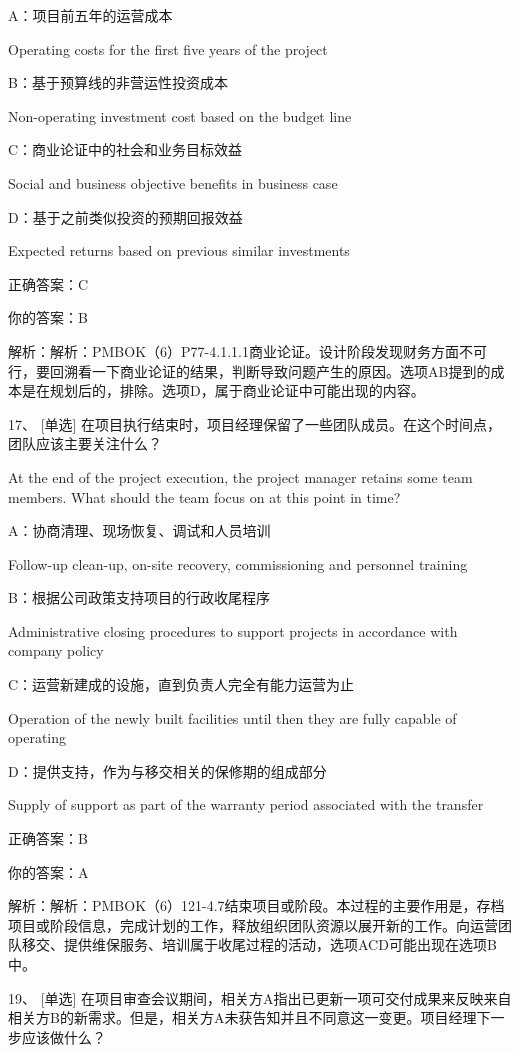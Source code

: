 A：项目前五年的运营成本

Operating costs for the first five years of the project

B：基于预算线的非营运性投资成本

Non-operating investment cost based on the budget line

C：商业论证中的社会和业务目标效益

Social and business objective benefits in business case

D：基于之前类似投资的预期回报效益

Expected returns based on previous similar investments

正确答案：C

你的答案：B

解析：解析：PMBOK（6）P77-4.1.1.1商业论证。设计阶段发现财务方面不可行，要回溯看一下商业论证的结果，判断导致问题产生的原因。选项AB提到的成本是在规划后的，排除。选项D，属于商业论证中可能出现的内容。


17、 [单选] 在项目执行结束时，项目经理保留了一些团队成员。在这个时间点，团队应该主要关注什么？

At the end of the project execution, the project manager retains some team members. What should the team focus on at this point in time?

A：协商清理、现场恢复、调试和人员培训

Follow-up clean-up, on-site recovery, commissioning and personnel training

B：根据公司政策支持项目的行政收尾程序

Administrative closing procedures to support projects in accordance with company policy

C：运营新建成的设施，直到负责人完全有能力运营为止

Operation of the newly built facilities until then they are fully capable of operating

D：提供支持，作为与移交相关的保修期的组成部分

Supply of support as part of the warranty period associated with the transfer

正确答案：B

你的答案：A

解析：解析：PMBOK（6）121-4.7结束项目或阶段。本过程的主要作用是，存档项目或阶段信息，完成计划的工作，释放组织团队资源以展开新的工作。向运营团队移交、提供维保服务、培训属于收尾过程的活动，选项ACD可能出现在选项B中。


19、 [单选] 在项目审查会议期间，相关方A指出已更新一项可交付成果来反映来自相关方B的新需求。但是，相关方A未获告知并且不同意这一变更。项目经理下一步应该做什么？

